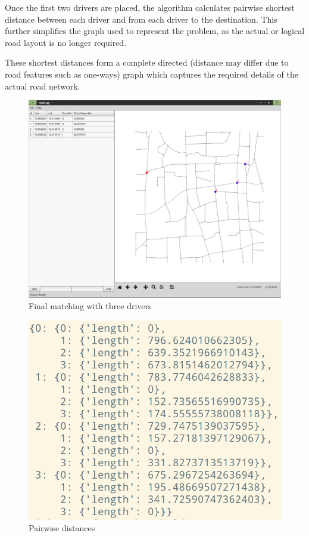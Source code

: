 \documentclass[main.tex]{subfiles}
\begin{document}
Once the first two drivers are placed, the algorithm calculates pairwise
shortest distance between each driver and from each driver to the destination.
This further simplifies the graph used to represent the problem, as the actual
or logical road layout is no longer required.

These shortest distances form a complete directed (distance may differ due to
road features such as one-ways) graph which captures the required details of the
actual road network.

\begin{figure}[htpb]
  \centering
  \includegraphics[width=\linewidth]{scr_5.png}
  \caption{Final matching with three drivers}
  \label{fig:scr5}
\end{figure}

\begin{figure}[htpb]
  \centering
  \includegraphics[width=\linewidth]{pairwise_1.png}
  \caption{Pairwise distances}
  \label{fig:p1}
\end{figure}
\end{document}
